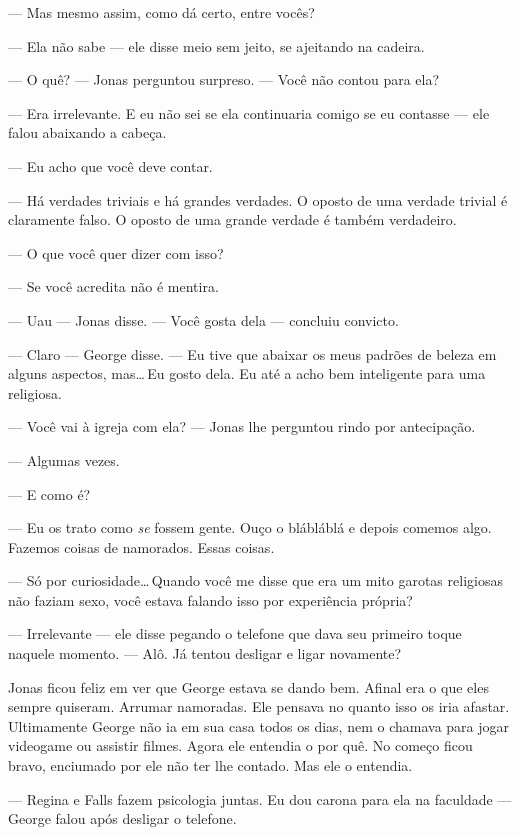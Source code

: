 --- Mas mesmo assim, como dá certo, entre vocês?

--- Ela não sabe --- ele disse meio sem jeito, se ajeitando na cadeira.

--- O quê? --- Jonas perguntou surpreso. --- Você não contou para ela?

--- Era irrelevante. E eu não sei se ela continuaria comigo se eu contasse --- ele falou\mudanca{,} abaixando a cabeça.

--- Eu acho que você deve contar.

--- Há verdades triviais e há grandes verdades. O oposto de uma verdade trivial é claramente falso. O oposto de uma grande verdade é também verdadeiro.

--- O que você quer dizer com isso?

--- Se você acredita não é mentira.

--- Uau --- Jonas disse. --- Você gosta dela --- concluiu\mudanca{,} convicto.

--- Claro --- George disse. --- Eu tive que abaixar os meus padrões de beleza em alguns aspectos, mas\ldots\,Eu gosto dela. Eu até a acho bem inteligente para uma religiosa.

--- Você vai à igreja com ela? --- Jonas lhe perguntou rindo por antecipação.

--- Algumas vezes.

--- E como é?

--- Eu os trato como \emph{se} fossem gente. Ouço o blábláblá e depois comemos algo. Fazemos coisas de namorados. Essas coisas.

--- Só por curiosidade\ldots\,Quando você me disse que era um mito garotas religiosas não faziam sexo, você estava falando isso por experiência própria?

--- Irrelevante --- ele disse\mudanca{,} pegando o telefone que dava seu primeiro toque naquele momento. --- Alô. Já tentou desligar e ligar novamente?

Jonas ficou feliz em ver que George estava se dando bem. Afinal\mudanca{,} era o que eles sempre quiseram. Arrumar namoradas. Ele pensava no quanto isso os iria afastar. Ultimamente George não ia em sua casa todos os dias, nem o chamava para jogar videogame ou assistir filmes. Agora ele entendia o por quê. No começo ficou bravo, enciumado por ele não ter lhe contado. Mas ele o entendia.

 --- Regina e Falls fazem psicologia juntas. Eu dou carona para ela na faculdade --- George falou após desligar o telefone.

